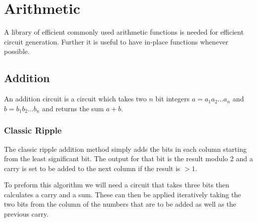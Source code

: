 \chapter{Arithmetic}

A library of efficient commonly used arithmetic functions is needed for efficient circuit generation.
Further it is useful to have in-place functions whenever possible.

\section{Addition}
  An addition circuit is a circuit which takes two $n$ bit integers $a = a_1a_2\dotsc a_n$ and $b = b_1b_2\dotsc b_n$ and returns the sum $a+b$.
  \subsection{Classic Ripple}
    The classic ripple addition method simply adds the bits in each column starting from the least significant bit.
    The output for that bit is the result modulo 2 and a carry is set to be added to the next column if the result is $>1$.

    To preform this algorithm we will need a circuit that takes three bits then calculates a carry and a sum.
    These can then be applied iteratively taking the two bits from the column of the numbers that are to be added as well as the previous carry.

